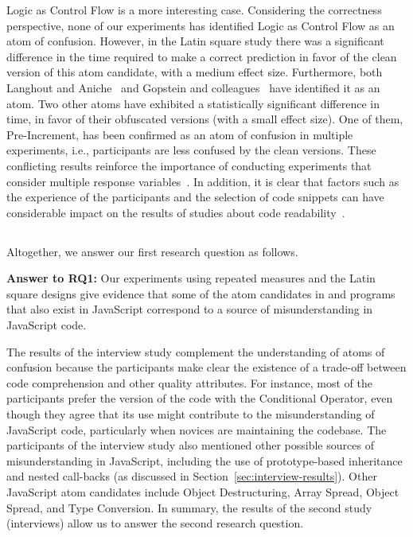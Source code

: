 Logic as Control Flow is a more interesting case. Considering the correctness perspective, none of our experiments has identified Logic as Control Flow as an atom of confusion. However, in the Latin square study there was a significant difference in the time required to make a correct prediction in favor of the clean version of this atom candidate, with a medium effect size. Furthermore, both Langhout and Aniche~\cite{Langhout:2021:ACJ} and Gopstein and colleagues~\cite{DBLP:conf/sigsoft/GopsteinIYDZYC17} have identified it as an atom. Two other atoms have exhibited a statistically significant difference in time, in favor of their obfuscated versions (with a small effect size). One of them, Pre-Increment, has been confirmed as an atom of confusion in multiple experiments, i.e., participants are less confused by the clean versions. These conflicting results reinforce the importance of conducting experiments that consider multiple response variables~\cite{Oliveira:2020:ECR}. In addition, it is clear that factors such as the experience of the participants and the selection of code snippets can have considerable impact on the results of studies about code readability~\cite{Feitelson:2021:CPC}.

\subsection{}

Altogether, we answer our first research question as follows. 

\begin{mh}
  {\bf Answer to RQ1:} Our experiments using repeated measures and the Latin square designs give evidence that some of the atom candidates in \clang and \cpplang programs that also exist in JavaScript correspond to a source of misunderstanding in
  JavaScript code. 
\end{mh}

The results of the interview study complement the understanding of atoms of confusion because the participants make clear the existence of a trade-off between code comprehension and other quality attributes. For instance, most of the participants prefer the version of the code with the Conditional Operator, even though they agree that its use might contribute to the misunderstanding of JavaScript code, particularly when novices are maintaining the codebase. The participants of the interview study also
mentioned other possible sources of misunderstanding in JavaScript,
including the use of prototype-based inheritance and nested call-backs (as discussed in Section~\ref{sec:interview-results}). Other JavaScript atom candidates include
Object Destructuring, Array Spread, Object Spread, and Type Conversion.
In summary, the results of the second study (interviews) allow
us to answer the second research question.

